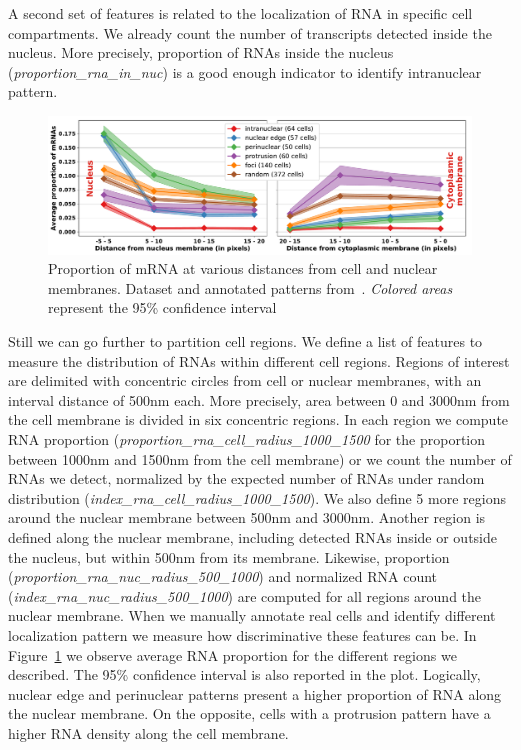 A second set of features is related to the localization of \ac{RNA} in specific cell compartments.
We already count the number of transcripts detected inside the nucleus.
More precisely, proportion of \ac{RNA}s inside the nucleus (\emph{proportion\_rna\_in\_nuc}) is a good enough indicator to identify intranuclear pattern.

\begin{figure}[h]
    \centering
    \includegraphics[width=\textwidth]{figures/chapter4/plot_topography}
    \caption{Proportion of mRNA at various distances from cell and nuclear membranes.
	Dataset and annotated patterns from~\cite{CHOUAIB_2020}.
	\textit{Colored areas} represent the 95\% confidence interval}
    \label{fig:features_topography}
\end{figure}

Still we can go further to partition cell regions.
We define a list of features to measure the distribution of \ac{RNA}s within different cell regions.
Regions of interest are delimited with concentric circles from cell or nuclear membranes, with an interval distance of 500nm each.
More precisely, area between 0 and 3000nm from the cell membrane is divided in six concentric regions.
In each region we compute \ac{RNA} proportion (\emph{proportion\_rna\_cell\_radius\_1000\_1500} for the proportion between 1000nm and 1500nm from the cell membrane) or we count the number of \ac{RNA}s we detect, normalized by the expected number of \ac{RNA}s under random distribution (\emph{index\_rna\_cell\_radius\_1000\_1500}).
We also define 5 more regions around the nuclear membrane between 500nm and 3000nm.
Another region is defined along the nuclear membrane, including detected \ac{RNA}s inside or outside the nucleus, but within 500nm from its membrane.
Likewise, proportion (\emph{proportion\_rna\_nuc\_radius\_500\_1000}) and normalized \ac{RNA} count (\emph{index\_rna\_nuc\_radius\_500\_1000}) are computed for all regions around the nuclear membrane.
When we manually annotate real cells and identify different localization pattern we measure how discriminative these features can be.
In Figure~\ref{fig:features_topography} we observe average \ac{RNA} proportion for the different regions we described.
The 95\% confidence interval is also reported in the plot.
Logically, nuclear edge and perinuclear patterns present a higher proportion of \ac{RNA} along the nuclear membrane.
On the opposite, cells with a protrusion pattern have a higher \ac{RNA} density along the cell membrane.

